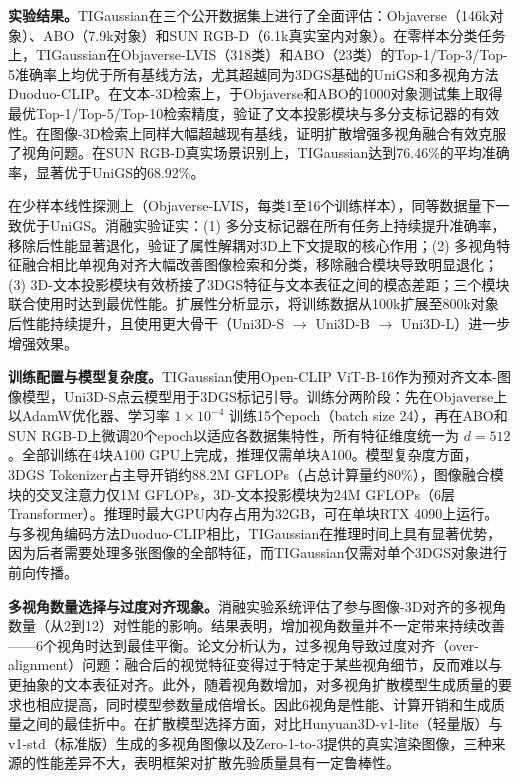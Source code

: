 \textbf{实验结果。}TIGaussian在三个公开数据集上进行了全面评估：Objaverse（146k对象）、ABO（7.9k对象）和SUN RGB-D（6.1k真实室内对象）。在零样本分类任务上，TIGaussian在Objaverse-LVIS（318类）和ABO（23类）的Top-1/Top-3/Top-5准确率上均优于所有基线方法，尤其超越同为3DGS基础的UniGS和多视角方法Duoduo-CLIP。在文本-3D检索上，于Objaverse和ABO的1000对象测试集上取得最优Top-1/Top-5/Top-10检索精度，验证了文本投影模块与多分支标记器的有效性。在图像-3D检索上同样大幅超越现有基线，证明扩散增强多视角融合有效克服了视角问题。在SUN RGB-D真实场景识别上，TIGaussian达到76.46\%的平均准确率，显著优于UniGS的68.92\%。

在少样本线性探测上（Objaverse-LVIS，每类1至16个训练样本），同等数据量下一致优于UniGS。消融实验证实：(1) 多分支标记器在所有任务上持续提升准确率，移除后性能显著退化，验证了属性解耦对3D上下文提取的核心作用；(2) 多视角特征融合相比单视角对齐大幅改善图像检索和分类，移除融合模块导致明显退化；(3) 3D-文本投影模块有效桥接了3DGS特征与文本表征之间的模态差距；三个模块联合使用时达到最优性能。扩展性分析显示，将训练数据从100k扩展至800k对象后性能持续提升，且使用更大骨干（Uni3D-S $\to$ Uni3D-B $\to$ Uni3D-L）进一步增强效果。

\textbf{训练配置与模型复杂度。}TIGaussian使用Open-CLIP ViT-B-16作为预对齐文本-图像模型，Uni3D-S点云模型用于3DGS标记引导。训练分两阶段：先在Objaverse上以AdamW优化器、学习率 $1\times10^{-4}$ 训练15个epoch（batch size 24），再在ABO和SUN RGB-D上微调20个epoch以适应各数据集特性，所有特征维度统一为 $d=512$。全部训练在4块A100 GPU上完成，推理仅需单块A100。模型复杂度方面，3DGS Tokenizer占主导开销约88.2M GFLOPs（占总计算量约80\%），图像融合模块的交叉注意力仅1M GFLOPs，3D-文本投影模块为24M GFLOPs（6层Transformer）。推理时最大GPU内存占用为32GB，可在单块RTX 4090上运行。与多视角编码方法Duoduo-CLIP相比，TIGaussian在推理时间上具有显著优势，因为后者需要处理多张图像的全部特征，而TIGaussian仅需对单个3DGS对象进行前向传播。

\textbf{多视角数量选择与过度对齐现象。}消融实验系统评估了参与图像-3D对齐的多视角数量（从2到12）对性能的影响。结果表明，增加视角数量并不一定带来持续改善——6个视角时达到最佳平衡。论文分析认为，过多视角导致过度对齐（over-alignment）问题：融合后的视觉特征变得过于特定于某些视角细节，反而难以与更抽象的文本表征对齐。此外，随着视角数增加，对多视角扩散模型生成质量的要求也相应提高，同时模型参数量成倍增长。因此6视角是性能、计算开销和生成质量之间的最佳折中。在扩散模型选择方面，对比Hunyuan3D-v1-lite（轻量版）与v1-std（标准版）生成的多视角图像以及Zero-1-to-3提供的真实渲染图像，三种来源的性能差异不大，表明框架对扩散先验质量具有一定鲁棒性。

